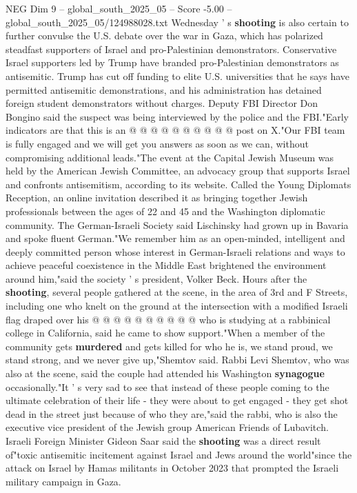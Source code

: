 \begin{textsample}{NEG Dim 9 – global\_south\_2025\_05 – Score -5.00 – global\_south\_2025\_05/124988028.txt}
Wednesday ' s \textbf{shooting} is also certain to further convulse the U.S. debate over the war in Gaza, which has polarized steadfast supporters of Israel and pro-Palestinian demonstrators.
Conservative Israel supporters led by Trump have branded pro-Palestinian demonstrators as antisemitic.
Trump has cut off funding to elite U.S. universities that he says have permitted antisemitic demonstrations, and his administration has detained foreign student demonstrators without charges.
Deputy FBI Director Don Bongino said the suspect was being interviewed by the police and the FBI."Early indicators are that this is an @ @ @ @ @ @ @ @ @ @ post on X."Our FBI team is fully engaged and we will get you answers as soon as we can, without compromising additional leads."The event at the Capital Jewish Museum was held by the American Jewish Committee, an advocacy group that supports Israel and confronts antisemitism, according to its website.
Called the Young Diplomats Reception, an online invitation described it as bringing together Jewish professionals between the ages of 22 and 45 and the Washington diplomatic community.
The German-Israeli Society said Lischinsky had grown up in Bavaria and spoke fluent German."We remember him as an open-minded, intelligent and deeply committed person whose interest in German-Israeli relations and ways to achieve peaceful coexistence in the Middle East brightened the environment around him,"said the society ' s president, Volker Beck.
Hours after the \textbf{shooting}, several people gathered at the scene, in the area of 3rd and F Streets, including one who knelt on the ground at the intersection with a modified Israeli flag draped over his @ @ @ @ @ @ @ @ @ @ who is studying at a rabbinical college in California, said he came to show support."When a member of the community gets \textbf{murdered} and gets killed for who he is, we stand proud, we stand strong, and we never give up,"Shemtov said.
Rabbi Levi Shemtov, who was also at the scene, said the couple had attended his Washington \textbf{synagogue} occasionally."It ' s very sad to see that instead of these people coming to the ultimate celebration of their life - they were about to get engaged - they get shot dead in the street just because of who they are,"said the rabbi, who is also the executive vice president of the Jewish group American Friends of Lubavitch.
Israeli Foreign Minister Gideon Saar said the \textbf{shooting} was a direct result of"toxic antisemitic incitement against Israel and Jews around the world"since the attack on Israel by Hamas militants in October 2023 that prompted the Israeli military campaign in Gaza.

\end{textsample}
